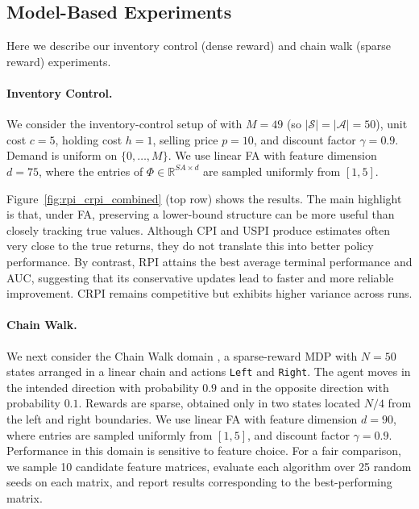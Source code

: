 \documentclass[twoside]{article}
\theoremstyle{plain}
\theoremstyle{definition}
\theoremstyle{remark}
\newcommand{\cA}{\mathcal{A}}
\newcommand{\cS}{\mathcal{S}}
\begin{document}
\subsection{Model-Based Experiments}
\label{subsec:model_based_experiments}

Here we describe our inventory control (dense reward) and chain walk (sparse reward) experiments. 

\paragraph{Inventory Control.}
We consider the inventory-control setup of \citet{bertsekas2012dynamic} with $M=49$ (so $|\cS|=|\cA|=50$), unit cost $c=5$, holding cost $h=1$, selling price $p=10$, and discount factor $\gamma=0.9$. Demand is uniform on $\{0,\dots,M\}$. We use linear FA with feature dimension $d=75$, where the entries of $\Phi \in \mathbb{R}^{SA \times d}$ are sampled uniformly from $[1,5]$.

Figure~\ref{fig:rpi_crpi_combined} (top row) shows the results. The main highlight is that, under FA, preserving a lower-bound structure can be more useful than closely tracking true values. Although CPI and USPI produce estimates often very close to the true returns, they do not translate this into better policy performance. By contrast, RPI attains the best average terminal performance and AUC, suggesting that its conservative updates lead to faster and more reliable improvement. CRPI remains competitive but exhibits higher variance across runs.

\paragraph{Chain Walk.}
We next consider the Chain Walk domain \citep{lagoudakis2003least}, a sparse-reward MDP with $N=50$ states arranged in a linear chain and actions \texttt{Left} and \texttt{Right}. The agent moves in the intended direction with probability $0.9$ and in the opposite direction with probability $0.1$. Rewards are sparse, obtained only in two states located $N/4$ from the left and right boundaries. We use linear FA with feature dimension $d=90$, where entries are sampled uniformly from $[1,5]$, and discount factor $\gamma=0.9$. Performance in this domain is sensitive to feature choice. For a fair comparison, we sample 10 candidate feature matrices, evaluate each algorithm over 25 random seeds on each matrix, and report results corresponding to the best-performing matrix.
\end{document}

